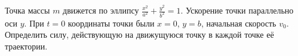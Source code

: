 Точка массы $m$ движется по эллипсу $\frac{x^2}{a^2} + \frac{y^2}{b^2} = 1$.
Ускорение точки параллельно оси $y$.
При $t = 0$ координаты точки были $x = 0$, $y = b$, начальная скорость $v_0$.
Определить силу, действующую на движущуюся точку в каждой точке её траектории.
